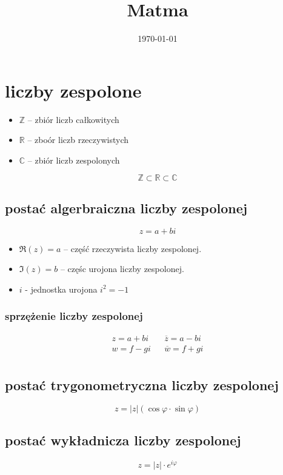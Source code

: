 \documentclass[11pt]{article}
\date{\today}
\title{Matma}
\begin{document}
\maketitle
\tableofcontents


\section{liczby zespolone}
\label{sec:org2c876c8}
\begin{itemize}
\item \(\mathbb{Z}\) -- zbiór liczb całkowitych
\item \(\mathbb{R}\) -- zboór liczb rzeczywistych
\item \(\mathbb{C}\) -- zbiór liczb zespolonych
\end{itemize}
$$\mathbb{Z} \subset \mathbb{R} \subset \mathbb{C}$$
\subsection{postać algerbraiczna liczby zespolonej}
\label{sec:orgf42123a}
$$z=a+bi$$

\begin{itemize}
\item \(\Re(z) = a\) -- część rzeczywista liczby zespolonej.
\item \(\Im(z) = b\) -- częśc urojona liczby zespolonej.
\item \(i\) - jednostka urojona \(i^2=-1\)
\end{itemize}
\subsubsection{sprzężenie liczby zespolonej}
\label{sec:org475d921}
\begin{latex}
\begin{align*}
  z=a+bi && \overline{z}=a-bi \\
  w=f-gi && \overline{w}=f+gi \\
\end{align*}
\end{latex}

\subsection{postać trygonometryczna liczby zespolonej}
\label{sec:org95881db}
$$z=|z|(\cos\varphi \cdot \sin\varphi)$$
\subsection{postać wykładnicza liczby zespolonej}
\label{sec:orga791e5c}
$$z=|z| \cdot e^{i\varphi}$$
\end{document}
